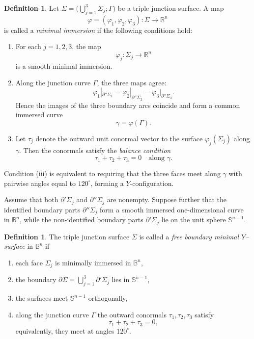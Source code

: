 \documentclass[11pt]{amsart}
\numberwithin{equation}{section}
\theoremstyle{theorem}
\theoremstyle{definition}
\newtheorem{definition}[theorem]{Definition}
\numberwithin{equation}{section}
\begin{document}
\begin{definition}\label{def:minimal_immersion}
Let $\Sigma = \big(\bigcup_{j=1}^3 \Sigma_j ; \Gamma \big)$ be a triple junction surface.
A map
\[
\varphi=(\varphi_1,\varphi_2,\varphi_3):\Sigma \to \mathbb{R}^n
\]
is called a \emph{minimal immersion} if the following conditions hold:

\begin{enumerate}
\item[(i)] For each $j=1,2,3$, the map
\[
\varphi_j:\Sigma_j\to\mathbb{R}^n
\]
is a smooth minimal immersion.

\item[(ii)] Along the junction curve $\Gamma$, the three maps agree:
\[
\varphi_1|_{\partial''\Sigma_1}
=
\varphi_2|_{\partial''\Sigma_2}
=
\varphi_3|_{\partial''\Sigma_3}.
\]
Hence the images of the three boundary arcs coincide and form a common immersed curve
\[
\gamma=\varphi(\Gamma).
\]

\item[(iii)] Let $\tau_j$ denote the outward unit conormal vector to the surface
$\varphi_j(\Sigma_j)$ along $\gamma$. Then the conormals satisfy the
\emph{balance condition}
\[
\tau_1+\tau_2+\tau_3=0 \quad \text{along } \gamma .
\]
\end{enumerate}

Condition (iii) is equivalent to requiring that the three faces meet along
$\gamma$ with pairwise angles equal to $120^\circ$, forming a $Y$-configuration.
\end{definition}

Assume that both $\partial' \Sigma_j$ and $\partial'' \Sigma_j$ are nonempty. 
Suppose further that the identified boundary parts $\partial'' \Sigma_j$ form a smooth immersed one-dimensional curve in $\mathbb{B}^n$, while the non-identified boundary parts $\partial' \Sigma_j$ lie on the unit sphere $\mathbb{S}^{n-1}$. 

\begin{definition}\label{def:freeboundary}
The triple junction surface $\Sigma$ is called a \emph{free boundary minimal $Y$–surface} in $\mathbb{B}^n$ if

\begin{enumerate}
\item each face $\Sigma_j$ is minimally immersed in $\mathbb{B}^n$,
\item the boundary $\partial\Sigma=\bigcup_{j=1}^3\partial'\Sigma_j$ lies in $\mathbb{S}^{n-1}$,
\item the surfaces meet $\mathbb{S}^{n-1}$ orthogonally,
\item along the junction curve $\Gamma$ the outward conormals $\tau_1,\tau_2,\tau_3$ satisfy
\[
\tau_1+\tau_2+\tau_3=0 ,
\]
equivalently, they meet at angles $120^\circ$.
\end{enumerate}
\end{definition}
\end{document}
